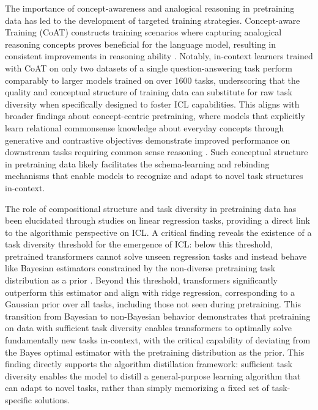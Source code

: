 \documentclass[11pt]{article}
\begin{document}
The importance of concept-awareness and analogical reasoning in pretraining data has led to the development of targeted training strategies. Concept-aware Training (CoAT) constructs training scenarios where capturing analogical reasoning concepts proves beneficial for the language model, resulting in consistent improvements in reasoning ability \cite{ref68}. Notably, in-context learners trained with CoAT on only two datasets of a single question-answering task perform comparably to larger models trained on over 1600 tasks, underscoring that the quality and conceptual structure of training data can substitute for raw task diversity when specifically designed to foster ICL capabilities. This aligns with broader findings about concept-centric pretraining, where models that explicitly learn relational commonsense knowledge about everyday concepts through generative and contrastive objectives demonstrate improved performance on downstream tasks requiring common sense reasoning \cite{ref69}. Such conceptual structure in pretraining data likely facilitates the schema-learning and rebinding mechanisms that enable models to recognize and adapt to novel task structures in-context.

The role of compositional structure and task diversity in pretraining data has been elucidated through studies on linear regression tasks, providing a direct link to the algorithmic perspective on ICL. A critical finding reveals the existence of a task diversity threshold for the emergence of ICL: below this threshold, pretrained transformers cannot solve unseen regression tasks and instead behave like Bayesian estimators constrained by the non-diverse pretraining task distribution as a prior \cite{ref48}. Beyond this threshold, transformers significantly outperform this estimator and align with ridge regression, corresponding to a Gaussian prior over all tasks, including those not seen during pretraining. This transition from Bayesian to non-Bayesian behavior demonstrates that pretraining on data with sufficient task diversity enables transformers to optimally solve fundamentally new tasks in-context, with the critical capability of deviating from the Bayes optimal estimator with the pretraining distribution as the prior. This finding directly supports the algorithm distillation framework: sufficient task diversity enables the model to distill a general-purpose learning algorithm that can adapt to novel tasks, rather than simply memorizing a fixed set of task-specific solutions.
\end{document}
